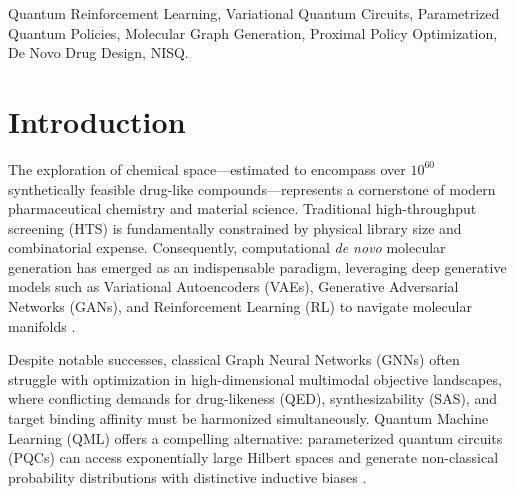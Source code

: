 \documentclass[conference]{IEEEtran}
\begin{document}
\begin{IEEEkeywords}
Quantum Reinforcement Learning, Variational Quantum Circuits, Parametrized Quantum Policies, Molecular Graph Generation, Proximal Policy Optimization, De Novo Drug Design, NISQ.
\end{IEEEkeywords}

\section{Introduction}
The exploration of chemical space---estimated to encompass over $10^{60}$ synthetically feasible drug-like compounds---represents a cornerstone of modern pharmaceutical chemistry and material science. Traditional high-throughput screening (HTS) is fundamentally constrained by physical library size and combinatorial expense. Consequently, computational \textit{de novo} molecular generation has emerged as an indispensable paradigm, leveraging deep generative models such as Variational Autoencoders (VAEs), Generative Adversarial Networks (GANs), and Reinforcement Learning (RL) to navigate molecular manifolds \cite{gomez2018automatic,decao2018molgan,you2018graph,olivecrona2017}.

Despite notable successes, classical Graph Neural Networks (GNNs) often struggle with optimization in high-dimensional multimodal objective landscapes, where conflicting demands for drug-likeness (QED), synthesizability (SAS), and target binding affinity must be harmonized simultaneously. Quantum Machine Learning (QML) offers a compelling alternative: parameterized quantum circuits (PQCs) can access exponentially large Hilbert spaces and generate non-classical probability distributions with distinctive inductive biases \cite{havlicek2019supervised,mitarai2018quantum,lloyd2018quantum,dallaire2018quantum}.
\end{document}

